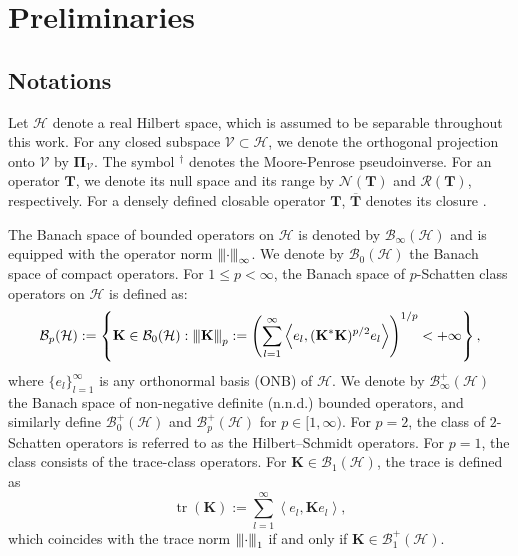 \documentclass[noinfoline]{imsart}\setcounter{tocdepth}{2}
\newcommand{\m}[1]{\mathbf{#1}}
\renewcommand{\c}[1]{\mathcal{#1}}
\newcommand{\innpr}[2]{{\left\langle {#1},{#2}\right\rangle}}
\DeclareMathOperator{\tr}{tr}
\newcommand{\vertiii}[1]{{\left\vert\kern-0.25ex\left\vert\kern-0.25ex\left\vert #1 
    \right\vert\kern-0.25ex\right\vert\kern-0.25ex\right\vert}} %
\theoremstyle{plain}
\begin{document}
\section{Preliminaries}\label{sec:prelim}

\subsection{Notations}
Let $\c{H}$ denote a real Hilbert space, which is assumed to be separable throughout this work. For any closed subspace $\c{V} \subset \c{H}$, we denote the orthogonal projection onto $\c{V}$ by $\m{\Pi}_{\c{V}}$. The symbol $^{\dagger}$ denotes the Moore-Penrose pseudoinverse. For an operator $\m{T}$, we denote its null space and its range by $\c{N}(\m{T})$ and $\c{R}(\m{T})$, respectively. For a densely defined closable operator $\m{T}$, $\overline{\m{T}}$ denotes its closure \cite{conway2019course}.

The Banach space of bounded operators on $\c{H}$ is denoted by $\c{B}_{\infty}(\c{H})$ and is equipped with the operator norm $\vertiii{\cdot}_{\infty}$. 
We denote by $\c{B}_{0}(\c{H})$ the Banach space of compact operators. For $1 \le p < \infty$, the Banach space of $p$-Schatten class operators on $\c{H}$ is defined as:
\begin{equation*}
    \c{B}_{p}(\c{H}) := \left\{ \m{K} \in \c{B}_{0}(\c{H}) : \vertiii{\m{K}}_{p} := \left( \sum_{l=1}^{\infty} \innpr{e_{l}}{(\m{K}^{*} \m{K})^{p/2} e_{l}} \right)^{1/p} < +\infty \right\}, 
\end{equation*}
where $\{e_{l}\}_{l=1}^{\infty}$ is any orthonormal basis (ONB) of $\c{H}$. We denote by $\c{B}_{\infty}^{+}(\c{H})$ the Banach space of non-negative definite (n.n.d.) bounded operators, and similarly define $\c{B}_{0}^{+}(\c{H})$ and $\c{B}_{p}^{+}(\c{H})$ for $p \in [1, \infty)$. For $p=2$, the class of $2$-Schatten operators is referred to as the Hilbert–Schmidt operators. For $p=1$, the class consists of the trace-class operators. For $\m{K} \in \c{B}_{1}(\c{H})$, the trace is defined as
\begin{equation*}
    \tr (\m{K}) := \sum_{l=1}^{\infty} \innpr{e_{l}}{\m{K} e_{l}},
\end{equation*}
which coincides with the trace norm $\vertiii{\cdot}_{1}$ if and only if $\m{K} \in \c{B}_{1}^{+}(\c{H})$.
\end{document}
